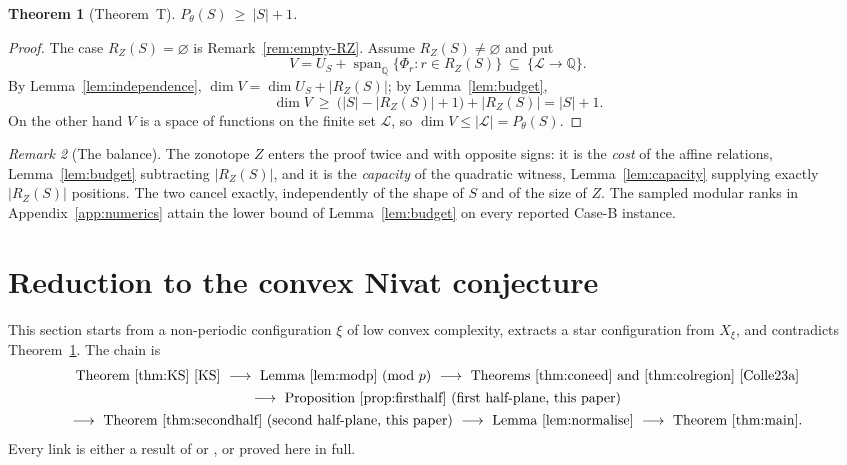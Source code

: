 \documentclass[11pt,reqno]{amsart}
\theoremstyle{plain}
\newtheorem{thm}{Theorem}[section]
\theoremstyle{definition}
\theoremstyle{remark}
\newtheorem{rem}[thm]{Remark}
\theoremstyle{plain}
\theoremstyle{remark}
\theoremstyle{definition}
\numberwithin{equation}{section}
\DeclareMathOperator{\spn}{span}
\newcommand{\Q}{\mathbb{Q}}
\newcommand{\cL}{\mathcal{L}}
\begin{document}
\begin{thm}[Theorem~T]\label{thm:main}
$P_\theta(S)\ \ge\ |S|+1$.
\end{thm}

\begin{proof}
The case $R_Z(S)=\varnothing$ is Remark~\ref{rem:empty-RZ}.  Assume
$R_Z(S)\ne\varnothing$ and put
\[V=U_S+\spn_{\Q}\{\Phi_r:r\in R_Z(S)\}\ \subseteq\ \{\cL\to\Q\}.\]
By Lemma~\ref{lem:independence}, $\dim V=\dim U_S+|R_Z(S)|$; by
Lemma~\ref{lem:budget},
\[\dim V\ \ge\ \bigl(|S|-|R_Z(S)|+1\bigr)+|R_Z(S)|=|S|+1 .\]
On the other hand $V$ is a space of functions on the finite set $\cL$, so
$\dim V\le|\cL|=P_\theta(S)$.
\end{proof}

\begin{rem}[The balance]\label{rem:balance}
The zonotope $Z$ enters the proof twice and with opposite signs: it is the
\emph{cost} of the affine relations, Lemma~\ref{lem:budget} subtracting
$|R_Z(S)|$, and it is the \emph{capacity} of the quadratic witness,
Lemma~\ref{lem:capacity} supplying exactly $|R_Z(S)|$ positions.  The two cancel
exactly, independently of the shape of $S$ and of the size of $Z$.  The
sampled modular ranks in Appendix~\ref{app:numerics} attain the lower bound of
Lemma~\ref{lem:budget} on every reported Case-B instance.
\end{rem}

\section{Reduction to the convex Nivat conjecture}\label{sec:reduction}

This section starts from a non-periodic configuration $\xi$ of low convex
complexity, extracts a star configuration from $X_\xi$, and contradicts
Theorem~\ref{thm:main}.  The chain is
\[
\begin{array}{c}
\text{Theorem~\ref{thm:KS}~\cite{KS}}\ \longrightarrow\
\text{Lemma~\ref{lem:modp} (mod $p$)}\ \longrightarrow\
\text{Theorems~\ref{thm:coneed} and \ref{thm:colregion}~\cite{Colle23a}}\\[4pt]
\longrightarrow\ \text{Proposition~\ref{prop:firsthalf} (first half-plane,
this paper)}\\[4pt]
\longrightarrow\ \text{Theorem~\ref{thm:secondhalf} (second half-plane,
this paper)}\ \longrightarrow\ \text{Lemma~\ref{lem:normalise}}\
\longrightarrow\ \text{Theorem~\ref{thm:main}} .
\end{array}
\]
Every link is either a result of \cite{KS} or \cite{Colle23a}, or proved here in
full.
\end{document}
